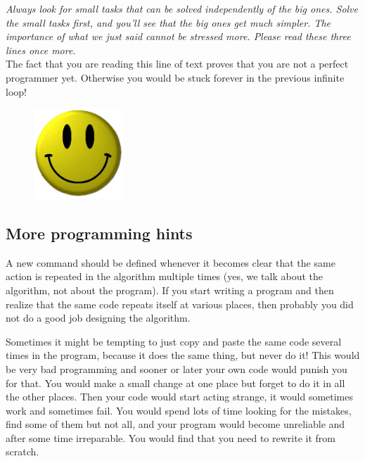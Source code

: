 \documentclass[article,A4,12pt]{llncs}
\begin{document}
{{{{{\em Always look for small tasks that can be solved independently of the big ones.
Solve the small tasks first, and you'll see that the big ones get much simpler. The 
importance of what we just said cannot be stressed more. Please read these three 
lines once more.}\\

\noindent
The fact that you are reading this line of text proves that you are not 
a perfect programmer yet. Otherwise you would be stuck forever in the 
previous infinite loop!

\begin{figure}[!ht]
\begin{center}
\includegraphics[width=0.3\textwidth]{img/smiley.png}
\end{center}
\vspace{-1cm}
\end{figure}


\subsection{More programming hints}

A new command should be defined whenever it becomes clear that the same 
action is repeated in the algorithm multiple times (yes, we talk about the algorithm,
not about the program). If you start writing a program and then realize that the same
code repeats itself at various places, then probably you did not do a good job 
designing the algorithm.

Sometimes it might be 
tempting to just copy and paste the same code several times in the 
program, because it does the same thing, but never do it! This would be very bad programming
and sooner or later your own code would punish you for that. 
You would make a small change at one place but forget to do it 
in all the other places. Then your code would start 
acting strange, it would sometimes work and sometimes fail. 
You would spend lots of time looking for the mistakes, find some 
of them but not all, and your program would become unreliable
and after some time irreparable. You would find that you need to 
rewrite it from scratch.

}}}}
\end{document}
